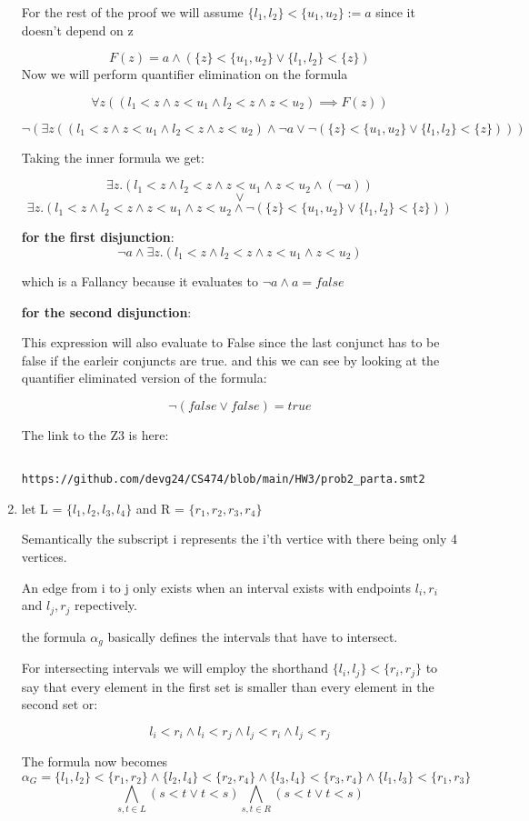 \documentclass{article}
\begin{document}
\begin{enumerate}[label=(\alph*)]
        For the rest of the proof we will assume $\{l_1,l_2\} < \{u_1,u_2 \} := a$ since it doesn't depend on z

        $$F(z) = a \land (\{z\} < \{u_1, u_2\} \lor \{l_1,l_2\} < \{z\})$$
     Now we will perform quantifier elimination on the formula 

     $$\forall z ((l_1 < z \land z < u_1 \land l_2 < z \land z < u_2) \implies F(z) ) $$

     $$\neg( \exists z ((l_1 < z \land z < u_1 \land l_2 < z \land z < u_2) \land \neg a \lor \neg(\{z\} < \{u_1, u_2\} \lor \{l_1,l_2\} < \{z\}) )) $$

     Taking the inner formula we get:

     $$\exists z. (l_1 < z \land l_2 < z \land z < u_1 \land z < u_2 \land (\neg a))$$
     $$\lor$$
     $$ \exists z. (l_1 < z \land l_2 < z \land z < u_1 \land z < u_2 \land \neg(\{z\} < \{u_1, u_2\} \lor \{l_1,l_2\} < \{z\}))$$

     \textbf{for the first disjunction}:
     $$\neg a \land \exists z. (l_1 < z \land l_2 < z \land z < u_1 \land z < u_2)$$

     which is a Fallancy because it evaluates to $\neg a \land a = false$

     \textbf{for the second disjunction}:

     This expression will also evaluate to False since the last conjunct has to be false if the earleir conjuncts are true. and this we can see by looking at the quantifier eliminated version of the formula:

     $$\neg (false \lor false) = true$$

     The link to the Z3 is here: \begin{verbatim}
        https://github.com/devg24/CS474/blob/main/HW3/prob2_parta.smt2
     \end{verbatim}

    \newpage

    \item let L = $\{l_1,l_2,l_3,l_4\}$ and R = $\{r_1,r_2,r_3,r_4\}$
    
    Semantically the subscript i represents the i'th vertice with there being only 4 vertices.

    An edge from i to j only exists when an interval exists with endpoints $l_i, r_i$ and $l_j, r_j$ repectively.

    the formula $\alpha_g$ basically defines the intervals that have to intersect.

    For intersecting intervals we will employ the shorthand $\{l_i, l_j\} < \{r_i,r_j\}$ to say that every element in the first set is smaller than every element in the second set or:

    $$l_i < r_i \land l_i < r_j \land l_j < r_i \land l_j < r_j$$

    The formula now becomes
    $$\alpha_G = \{l_1,l_2\} < \{r_1,r_2\} \land \{l_2,l_4\} < \{r_2,r_4\} \land \{l_3,l_4\} < \{r_3, r_4\} \land \{l_1, l_3\} < \{r_1, r_3\}$$
    $$ \bigwedge_{s ,t \in L}(s < t \lor t < s) \bigwedge_{s,t \in R}(s < t \lor t < s)$$     
\end{enumerate}
\end{document}
